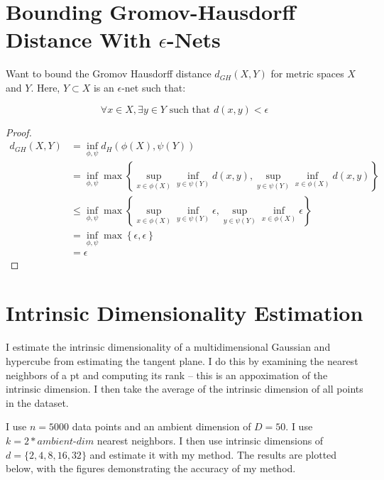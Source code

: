 \documentclass{article}
\begin{document}
\section{Bounding Gromov-Hausdorff Distance With $\epsilon$-Nets}

    Want to bound the Gromov Hausdorff distance $d_{GH}(X,Y)$ for metric spaces $X$ and $Y$. Here, $Y \subset X$ is an $\epsilon$-net such that:

    \begin{equation*}
        \forall x \in X, \exists y \in Y \text{ such that } d(x,y) < \epsilon
    \end{equation*}

    \begin{proof}
        \begin{align*}
            d_{GH}(X,Y) &= \inf_{\phi, \psi} d_H(\phi(X), \psi(Y)) \\
            &= \inf_{\phi, \psi} \max \left\{ \sup_{x \in \phi(X)} \inf_{y \in \psi(Y)} d(x,y), \sup_{y \in \psi(Y)} \inf_{x \in \phi(X)} d(x,y) \right\} \\
            & \leq \inf_{\phi, \psi} \max \left\{ \sup_{x \in \phi(X)} \inf_{y \in \psi(Y)} \epsilon, \sup_{y \in \psi(Y)} \inf_{x \in \phi(X)} \epsilon \right\} \\
            &= \inf_{\phi, \psi} \max \left\{ \epsilon, \epsilon \right\} \\
            &= \epsilon
        \end{align*}
    \end{proof}

\section{Intrinsic Dimensionality Estimation}

    I estimate the intrinsic dimensionality of a multidimensional Gaussian and hypercube from estimating the tangent plane. I do this by examining the nearest neighbors of a pt and computing its rank -- this is an appoximation of the intrinsic dimension. I then take the average of the intrinsic dimension of all points in the dataset.
    
    I use $n=5000$ data points and an ambient dimension of $D = 50$. I use $k=2*\textit{ambient-dim}$ nearest neighbors. I then use intrinsic dimensions of $d = \{2, 4, 8, 16, 32 \}$ and estimate it with my method. The results are plotted below, with the figures demonstrating the accuracy of my method.
\end{document}
